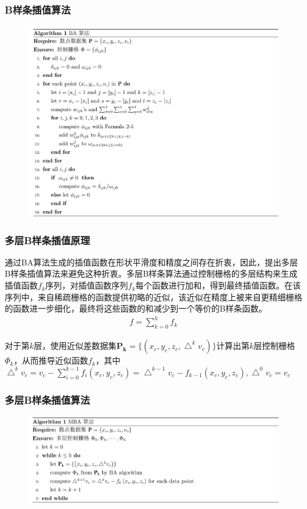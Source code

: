 \documentclass{beamer}
\begin{document}
\begin{frame}
    \frametitle{B样条插值算法}
    \begin{figure}[htbp]
        \centering
        \includegraphics[height=0.85\textheight]{figures/BA算法.jpg}
    \end{figure}
\end{frame}

\begin{frame}
    \frametitle{多层B样条插值原理}
    通过BA算法生成的插值函数在形状平滑度和精度之间存在折衷，因此，提出多层B样条插值算法来避免这种折衷。多层B样条算法通过控制栅格的多层结构来生成插值函数$ f_{k} $序列，对插值函数序列$ f_{k} $每个函数进行加和，得到最终插值函数。在该序列中，来自稀疏栅格的函数提供初略的近似，该近似在精度上被来自更精细栅格的函数进一步细化，最终将这些函数的和减少到一个等价的B样条函数。
    \begin{eqnarray}
        f = \sum_{k=0}^{h} f_{k}
    \end{eqnarray}

    对于第$ k $层，使用近似差数据集$ \mathbf{P_{k}} = \{ \left( x_{c}, y_{c}, z_{c}, \bigtriangleup^{k}v_{c} \right) \} $计算出第$ k $层控制栅格$ \Phi_{k} $，从而推导近似函数$ f_{k} $，其中$ \bigtriangleup^{k}v_{c} = v_{c} - \sum_{i=0}^{k-1}f_{i}\left( x_{c}, y_{c}, z_{c} \right) = \bigtriangleup^{k-1}v_{c} - f_{k-1}\left( x_{c}, y_{c}, z_{c} \right) , \bigtriangleup^{0}v_{c} = v_{c} $
\end{frame}

\begin{frame}
    \frametitle{多层B样条插值算法}
    \begin{figure}
        \centering
        \includegraphics[height=0.70\textheight]{figures/MBA算法.jpg}
    \end{figure}
\end{frame}
\end{document}
